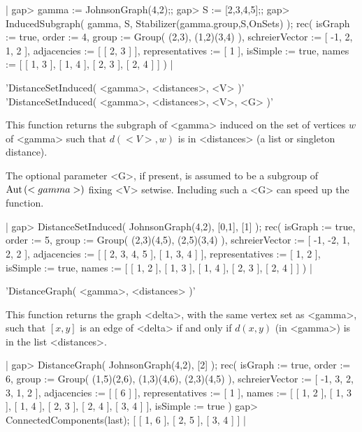 |    gap> gamma := JohnsonGraph(4,2);;
    gap> S := [2,3,4,5];;
    gap> InducedSubgraph( gamma, S, Stabilizer(gamma.group,S,OnSets) );
    rec(
      isGraph := true,
      order := 4,
      group := Group( (2,3), (1,2)(3,4) ),
      schreierVector := [ -1, 2, 1, 2 ],
      adjacencies := [ [ 2, 3 ] ],
      representatives := [ 1 ],
      isSimple := true,
      names := [ [ 1, 3 ], [ 1, 4 ], [ 2, 3 ], [ 2, 4 ] ] ) |


'DistanceSetInduced( <gamma>, <distances>, <V> )' \\
'DistanceSetInduced( <gamma>, <distances>, <V>, <G> )'

This  function  returns the  subgraph  of <gamma>  induced on  the set of
vertices $w$ of <gamma> such that $d(<V>,w)$ is in <distances> (a list or
singleton distance).

The optional  parameter <G>,  if present, is assumed to be a subgroup  of
${\rm Aut}\,(<gamma>)$  fixing <V> setwise.   Including such a  <G> can speed up
the function.

|    gap> DistanceSetInduced( JohnsonGraph(4,2), [0,1], [1] );
    rec(
      isGraph := true,
      order := 5,
      group := Group( (2,3)(4,5), (2,5)(3,4) ),
      schreierVector := [ -1, -2, 1, 2, 2 ],
      adjacencies := [ [ 2, 3, 4, 5 ], [ 1, 3, 4 ] ],
      representatives := [ 1, 2 ],
      isSimple := true,
      names := [ [ 1, 2 ], [ 1, 3 ], [ 1, 4 ], [ 2, 3 ], [ 2, 4 ] ] ) |


'DistanceGraph( <gamma>, <distances> )'

This function  returns the  graph <delta>,  with the same  vertex set  as
<gamma>, such that $[x,y]$ is  an edge of <delta> if and only if $d(x,y)$
(in <gamma>) is in the list <distances>.

|    gap> DistanceGraph( JohnsonGraph(4,2), [2] );
    rec(
      isGraph := true,
      order := 6,
      group := Group( (1,5)(2,6), (1,3)(4,6), (2,3)(4,5) ),
      schreierVector := [ -1, 3, 2, 3, 1, 2 ],
      adjacencies := [ [ 6 ] ],
      representatives := [ 1 ],
      names := [ [ 1, 2 ], [ 1, 3 ], [ 1, 4 ], [ 2, 3 ], [ 2, 4 ],
          [ 3, 4 ] ],
      isSimple := true )
    gap> ConnectedComponents(last);
    [ [ 1, 6 ], [ 2, 5 ], [ 3, 4 ] ] |


